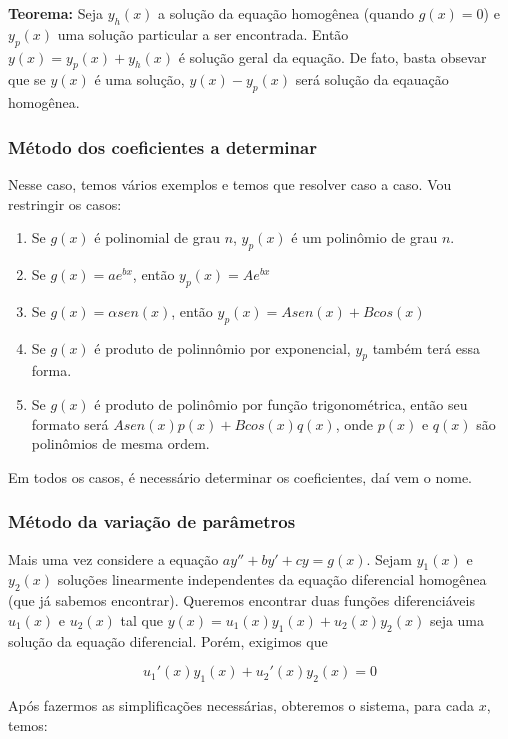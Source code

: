 \documentclass[12pt]{article}
\begin{document}
\textbf{Teorema:} Seja $y_h(x)$ a solução da equação homogênea (quando $g(x) =
0$) e $y_p(x)$ uma solução particular a ser encontrada. Então $y(x) = y_p(x) +
y_h(x)$ é solução geral da equação. De fato, basta obsevar que se $y(x)$ é uma
solução, $y(x) - y_p(x)$ será solução da eqauação homogênea. 

\subsubsection{Método dos coeficientes a determinar}

Nesse caso, temos vários exemplos e temos que resolver caso a caso. Vou
restringir os casos:

\begin{enumerate}
    \item Se $g(x)$ é polinomial de grau $n$, $y_p(x)$ é um polinômio de grau
    $n$. 
    \item Se $g(x) = ae^{bx}$, então $y_p(x) = Ae^{bx}$
    \item Se $g(x) = \alpha sen(x)$, então $y_p(x) = Asen(x) + Bcos(x)$
    \item Se $g(x)$ é produto de polinnômio por exponencial, $y_p$ também terá
   essa forma. 
   \item Se $g(x)$ é produto de polinômio por função trigonométrica, então seu
  formato será  $Asen(x)p(x) + Bcos(x)q(x)$, onde $p(x)$ e $q(x)$ são
  polinômios de mesma ordem. 
\end{enumerate}

Em todos os casos, é necessário determinar os coeficientes, daí vem o nome. 

\subsubsection{Método da variação de parâmetros}

Mais uma vez considere a equação $ay'' + by' + cy = g(x)$. Sejam $y_1(x)$ e
$y_2(x)$ soluções linearmente independentes da equação diferencial homogênea
(que já sabemos encontrar). Queremos encontrar duas funções diferenciáveis
$u_1(x)$ e $u_2(x)$ tal que $y(x) = u_1(x)y_1(x) + u_2(x)y_2(x)$ seja uma
solução da equação diferencial. Porém, exigimos que 

\begin{equation}
    u_1'(x)y_1(x) + u_2'(x)y_2(x) = 0
\end{equation}

Após fazermos as simplificações necessárias, obteremos o sistema, para cada
$x$, temos:  
\end{document}
